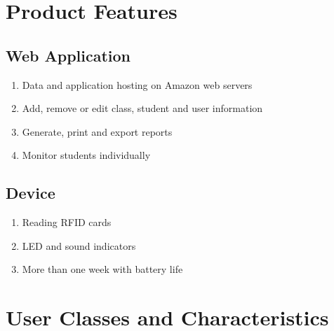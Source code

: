 \documentclass{scrreprt}
\begin{document}
\section{Product Features}

\subsection{ Web Application}

\begin{enumerate}[leftmargin=5\parindent, label=FE-\arabic*:]
  \item Data and application hosting on Amazon web servers
  \item Add, remove or edit class, student and user information
  \item Generate, print and export reports
  \item Monitor students individually
\end{enumerate}

\subsection{Device}

\begin{enumerate}[leftmargin=5\parindent, label=FE-\arabic*:]
  \item Reading RFID cards
  \item LED and sound indicators 
  \item More than one week with battery life
\end{enumerate}

\section{User Classes and Characteristics}
\end{document}
